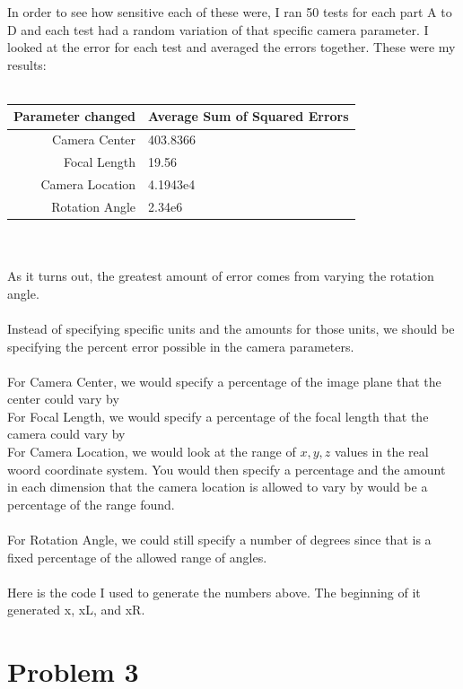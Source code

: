 \documentclass[11pt,psfig]{article}
\begin{document}
In order to see how sensitive each of these were, I ran 50 tests for each part A to D and each test had a random variation of that specific camera parameter. I looked at the error for each test and averaged the errors together. These were my results:\\
\\
\begin{tabular}{ r |l }
Parameter changed & Average Sum of Squared Errors\\
  \hline                       
  Camera Center & 403.8366  \\
  Focal Length & 19.56 \\
  Camera Location & 4.1943e4 \\
  Rotation Angle & 2.34e6
\end{tabular}
\\
\\
As it turns out, the greatest amount of error comes from varying the rotation angle. \\
\\
Instead of specifying specific units and the amounts for those units, we should be specifying the percent error possible in the camera parameters. \\
\\
For Camera Center, we would specify a percentage of the image plane that the center could vary by\\
For Focal Length, we would specify a percentage of the focal length that the camera could vary by\\
For Camera Location, we would look at the range of $x,y,z$ values in the real woord coordinate system. You would then specify a percentage and the amount in each dimension that the camera location is allowed to vary by would be a percentage of the range found.\\
\\
For Rotation Angle, we could still specify a number of degrees since that is a fixed percentage of the allowed range of angles.\\
\\
Here is the code I used to generate the numbers above. The beginning of it generated x, xL, and xR.


\newpage


\section{Problem 3}
\end{document}

